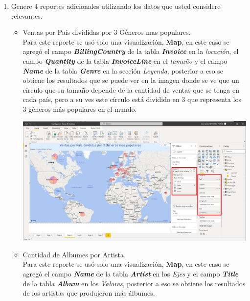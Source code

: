 \documentclass[12pt,letterpaper]{article}
\newcommand\tab[1][1cm]{\hspace*{#1}}
\begin{document}
\begin{enumerate}[\tab 1.]
\begin{center}
        \end{center}
        \item Genere 4 reportes adicionales utilizando los datos que usted considere relevantes.\\[0.1in]
        \begin{itemize}
            \item Ventas por País divididas por 3 Géneros mas populares.\\[0.1in]
            Para este reporte se usó solo una visualización, \textbf{Map}, en este caso se agregó el campo \textit{\textbf{BillingCountry}} de la tabla \textit{\textbf{Invoice}} en la \textit{locación}, el campo \textit{\textbf{Quantity}} de la tabla \textit{\textbf{InvoiceLine}} en el \textit{tamaño} y el campo \textit{\textbf{Name}} de la tabla \textit{\textbf{Genre}} en la sección \textit{Leyenda}, posterior a eso se obtiene los resultados que se puede ver en la imagen donde se ve que un círculo que su tamaño depende de la cantidad de ventas que se tenga en cada país, pero a su ves este círculo está dividido en 3 que representa los 3 géneros más populares en el mundo.
            \begin{center}
                \includegraphics[width=13cm]{./img/img23.1.png}
            \end{center}
            \item Cantidad de Albumes por Artista.\\[0.1in]
            Para este reporte se usó solo una visualización, \textbf{Map}, en este caso se agregó el campo \textit{\textbf{Name}} de la tabla \textit{\textbf{Artist}} en los \textit{Ejes} y el campo \textit{\textbf{Title}} de la tabla \textit{\textbf{Album}} en los \textit{Valores}, posterior a eso se obtiene los resultados de los artistas que produjeron más álbumes.
            \begin{center}

\end{center}
\end{itemize}
\end{enumerate}
\end{document}
